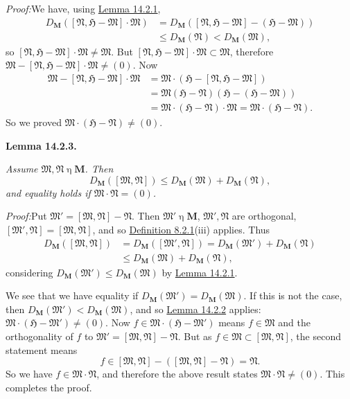 \documentclass[12pt,b5paper,twoside]{article}
\newcommand{\Hspace}{\mathfrak H}
\newcommand{\M}{\mathbf M}
\newcommand{\Lemma}[1]{%
  \par\smallskip\noindent\phantomsection\label{lem:#1}\textbf{Lemma #1.}\enspace
}
\newcommand{\Proof}{\par\noindent\textit{Proof:}\enspace}
\newcommand{\defref}[1]{\hyperref[def:#1]{Definition #1}}
\newcommand{\lemref}[1]{\hyperref[lem:#1]{Lemma #1}}
\begin{document}
\Proof We have, using \lemref{14.2.1},
\[
\begin{aligned}
D_{\M}([\mathfrak N,\Hspace-\mathfrak M]\cdot\mathfrak M)
 &=D_{\M}([\mathfrak N,\Hspace-\mathfrak M]
              -(\Hspace-\mathfrak M))\\
 &\leq D_{\M}(\mathfrak N)<D_{\M}(\mathfrak M),
\end{aligned}
\]
so \([\mathfrak N,\Hspace-\mathfrak M]\cdot\mathfrak M\ne\mathfrak M\).
But \([\mathfrak N,\Hspace-\mathfrak M]\cdot\mathfrak M\subset\mathfrak M\),
therefore
\(\mathfrak M-[\mathfrak N,\Hspace-\mathfrak M]\cdot\mathfrak M\ne(0)\).
Now
\[
\begin{aligned}
\mathfrak M-[\mathfrak N,\Hspace-\mathfrak M]\cdot\mathfrak M
 &=\mathfrak M\cdot(\Hspace-[\mathfrak N,\Hspace-\mathfrak M])\\
 &=\mathfrak M(\Hspace-\mathfrak N)
       (\Hspace-(\Hspace-\mathfrak M))\\
 &=\mathfrak M\cdot(\Hspace-\mathfrak N)\cdot\mathfrak M
 =\mathfrak M\cdot(\Hspace-\mathfrak N).
\end{aligned}
\]
So we proved \(\mathfrak M\cdot(\Hspace-\mathfrak N)\ne(0)\).

\Lemma{14.2.3}
{\itshape Assume \(\mathfrak M,\mathfrak N\mathbin\eta\M\). Then
\[
 D_{\M}([\mathfrak M,\mathfrak N])
 \leq D_{\M}(\mathfrak M)+D_{\M}(\mathfrak N),
\]
and equality holds if \(\mathfrak M\cdot\mathfrak N=(0)\).}

\Proof Put \(\mathfrak M'=[\mathfrak M,\mathfrak N]-\mathfrak N\). Then
\(\mathfrak M'\mathbin\eta\M\), \(\mathfrak M',\mathfrak N\) are
orthogonal, \([\mathfrak M',\mathfrak N]=[\mathfrak M,\mathfrak N]\), and
so \defref{8.2.1}(iii) applies. Thus
\[
\begin{aligned}
D_{\M}([\mathfrak M,\mathfrak N])
 &=D_{\M}([\mathfrak M',\mathfrak N])
  =D_{\M}(\mathfrak M')+D_{\M}(\mathfrak N)\\
 &\leq D_{\M}(\mathfrak M)+D_{\M}(\mathfrak N),
\end{aligned}
\]
considering \(D_{\M}(\mathfrak M')\leq D_{\M}(\mathfrak M)\) by
\lemref{14.2.1}.

We see that we have equality if
\(D_{\M}(\mathfrak M')=D_{\M}(\mathfrak M)\). If this is not the case, then
\(D_{\M}(\mathfrak M')<D_{\M}(\mathfrak M)\), and so \lemref{14.2.2}
applies: \(\mathfrak M\cdot(\Hspace-\mathfrak M')\ne(0)\). Now
\(f\in\mathfrak M\cdot(\Hspace-\mathfrak M')\) means
\(f\in\mathfrak M\) and the orthogonality of \(f\) to
\(\mathfrak M'=[\mathfrak M,\mathfrak N]-\mathfrak N\). But as
\(f\in\mathfrak M\subset[\mathfrak M,\mathfrak N]\), the second statement
means
\[
 f\in[\mathfrak M,\mathfrak N]
  -([\mathfrak M,\mathfrak N]-\mathfrak N)=\mathfrak N.
\]
So we have \(f\in\mathfrak M\cdot\mathfrak N\), and therefore the above
result states \(\mathfrak M\cdot\mathfrak N\ne(0)\). This completes the proof.
\end{document}
